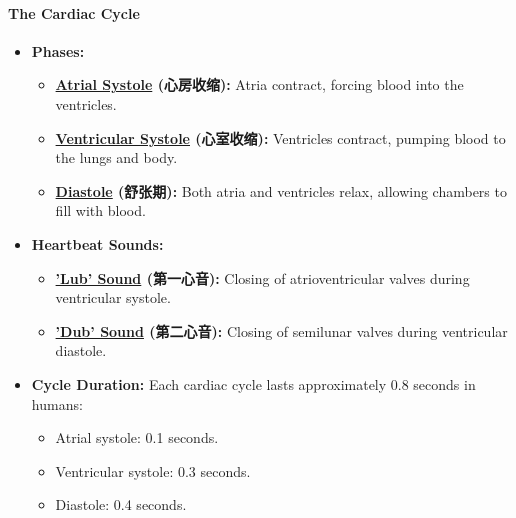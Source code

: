 \paragraph{The Cardiac Cycle}
\begin{itemize}
    \item \textbf{Phases:}
    \begin{itemize}
        \item \textbf{\underline{Atrial Systole} (心房收缩):} Atria contract, forcing blood into the ventricles.
        \item \textbf{\underline{Ventricular Systole} (心室收缩):} Ventricles contract, pumping blood to the lungs and body.
        \item \textbf{\underline{Diastole} (舒张期):} Both atria and ventricles relax, allowing chambers to fill with blood.
    \end{itemize}
    \item \textbf{Heartbeat Sounds:}
    \begin{itemize}
        \item \textbf{\underline{'Lub' Sound} (第一心音):} Closing of atrioventricular valves during ventricular systole.
        \item \textbf{\underline{'Dub' Sound} (第二心音):} Closing of semilunar valves during ventricular diastole.
    \end{itemize}
    \item \textbf{Cycle Duration:} Each cardiac cycle lasts approximately 0.8 seconds in humans:
    \begin{itemize}
        \item Atrial systole: 0.1 seconds.
        \item Ventricular systole: 0.3 seconds.
        \item Diastole: 0.4 seconds.
    \end{itemize}
    \begin{figure}[H]
        \centering

\end{figure}
\end{itemize}
